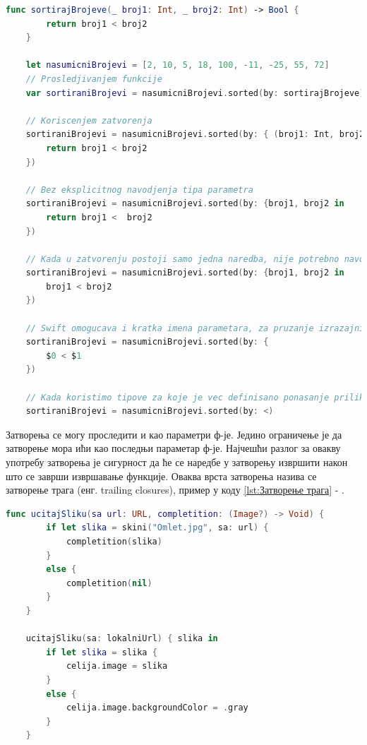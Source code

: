 \documentclass[12pt,oneside]{memoir}
\begin{document}
\begin{lstlisting}[caption=\textit{{Израз затворења за сортирање}}, label={lst:Израз затворења за сортирање}, language=Swift, frame=single]
    func sortirajBrojeve(_ broj1: Int, _ broj2: Int) -> Bool {
        return broj1 < broj2
    }
    
    let nasumicniBrojevi = [2, 10, 5, 18, 100, -11, -25, 55, 72]
    // Prosledjivanjem funkcije
    var sortiraniBrojevi = nasumicniBrojevi.sorted(by: sortirajBrojeve)
    
    // Koriscenjem zatvorenja
    sortiraniBrojevi = nasumicniBrojevi.sorted(by: { (broj1: Int, broj2: Int) -> Bool in
        return broj1 < broj2
    })
    
    // Bez eksplicitnog navodjenja tipa parametra
    sortiraniBrojevi = nasumicniBrojevi.sorted(by: {broj1, broj2 in 
        return broj1 <  broj2
    })
    
    // Kada u zatvorenju postoji samo jedna naredba, nije potrebno navodjenje kljucne reci 'return', povratna vrednost bice vrednost izvrsenja te naredbe
    sortiraniBrojevi = nasumicniBrojevi.sorted(by: {broj1, broj2 in 
        broj1 < broj2
    })
    
    // Swift omogucava i kratka imena parametara, za pruzanje izrazajnije sintakse
    sortiraniBrojevi = nasumicniBrojevi.sorted(by: { 
        $0 < $1
    })
    
    // Kada koristimo tipove za koje je vec definisano ponasanje prilikom poredjenja, mozemo proslediti samo kako zelimo da sortiramo clanove niza
    sortiraniBrojevi = nasumicniBrojevi.sorted(by: <)
\end{lstlisting}

\indent Затворења се могу проследити и као параметри ф-је. Једино ограничење је да затворење мора ићи као последњи параметар ф-је. Најчешћи разлог за овакву употребу затворења је сигурност да ће се наредбе у затворењу извршити након што се заврши извршавање функције. Оваква врста затворења назива се затворење трага (енг. trailing closures), пример у коду \ref{lst:Затворење трага} - .

\begin{lstlisting}[caption=\textit{{Затворење трага}}, label={lst:Затворење трага}, language=Swift, frame=single]
    func ucitajSliku(sa url: URL, completition: (Image?) -> Void) {
        if let slika = skini("Omlet.jpg", sa: url) {
            completition(slika)
        }
        else {
            completition(nil)
        }
    }
    
    ucitajSliku(sa: lokalniUrl) { slika in
        if let slika = slika {
            celija.image = slika
        }
        else {
            celija.image.backgroundColor = .gray
        }
    }
\end{lstlisting}
\end{document}
